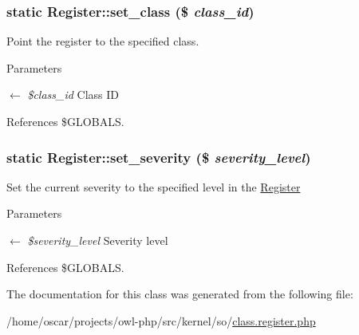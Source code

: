 \subsubsection[{set\_\-class}]{\setlength{\rightskip}{0pt plus 5cm}static Register::set\_\-class (\$ {\em class\_\-id})}\label{classRegister_a58e49ccb1fe4e441d0329e879c922aa0}
Point the register to the specified class.


\begin{DoxyParams}{Parameters}
\item[\mbox{$\leftarrow$} {\em \$class\_\-id}]Class ID \end{DoxyParams}


References \$GLOBALS.

\subsubsection[{set\_\-severity}]{\setlength{\rightskip}{0pt plus 5cm}static Register::set\_\-severity (\$ {\em severity\_\-level})}\label{classRegister_a0adde8d67d77b9b4d66156272cb48ae4}
Set the current severity to the specified level in the \hyperlink{classRegister}{Register}


\begin{DoxyParams}{Parameters}
\item[\mbox{$\leftarrow$} {\em \$severity\_\-level}]Severity level \end{DoxyParams}


References \$GLOBALS.



The documentation for this class was generated from the following file:\begin{DoxyCompactItemize}
\item 
/home/oscar/projects/owl-\/php/src/kernel/so/\hyperlink{class_8register_8php}{class.register.php}\end{DoxyCompactItemize}
